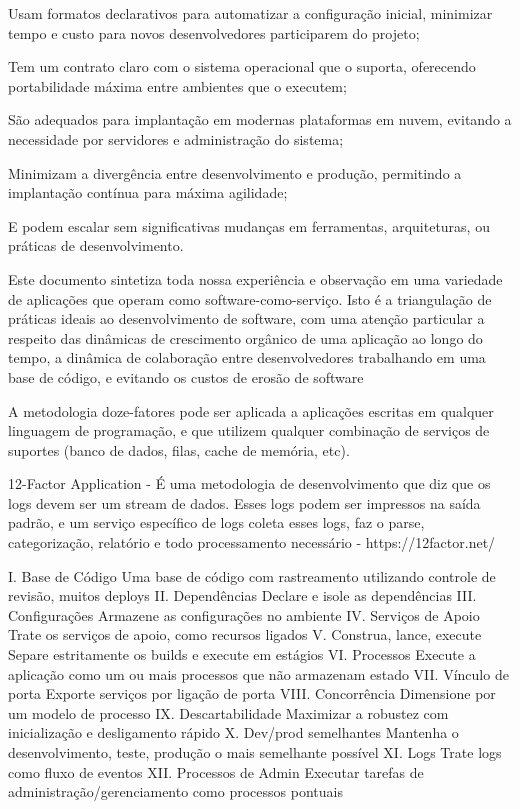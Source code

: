 Usam formatos declarativos para automatizar a configuração inicial, minimizar tempo e custo para novos desenvolvedores participarem do projeto;

Tem um contrato claro com o sistema operacional que o suporta, oferecendo portabilidade máxima entre ambientes que o executem;

São adequados para implantação em modernas plataformas em nuvem, evitando a necessidade por servidores e administração do sistema;

Minimizam a divergência entre desenvolvimento e produção, permitindo a implantação contínua para máxima agilidade;

E podem escalar sem significativas mudanças em ferramentas, arquiteturas, ou práticas de desenvolvimento.

Este documento sintetiza toda nossa experiência e observação em uma variedade de aplicações que operam como software-como-serviço. Isto é a triangulação de práticas ideais ao desenvolvimento de software, com uma atenção particular a respeito das dinâmicas de crescimento orgânico de uma aplicação ao longo do tempo, a dinâmica de colaboração entre desenvolvedores trabalhando em uma base de código, e evitando os custos de erosão de software

A metodologia doze-fatores pode ser aplicada a aplicações escritas em qualquer linguagem de programação, e que utilizem qualquer combinação de serviços de suportes (banco de dados, filas, cache de memória, etc).

12-Factor Application - É uma metodologia de desenvolvimento que diz que os logs devem ser um stream de dados. Esses logs podem ser impressos na saída padrão, e um serviço específico de logs coleta esses logs, faz o parse, categorização, relatório e todo processamento necessário - https://12factor.net/

I. Base de Código
Uma base de código com rastreamento utilizando controle de revisão, muitos deploys
II. Dependências
Declare e isole as dependências
III. Configurações
Armazene as configurações no ambiente
IV. Serviços de Apoio
Trate os serviços de apoio, como recursos ligados
V. Construa, lance, execute
Separe estritamente os builds e execute em estágios
VI. Processos
Execute a aplicação como um ou mais processos que não armazenam estado
VII. Vínculo de porta
Exporte serviços por ligação de porta
VIII. Concorrência
Dimensione por um modelo de processo
IX. Descartabilidade
Maximizar a robustez com inicialização e desligamento rápido
X. Dev/prod semelhantes
Mantenha o desenvolvimento, teste, produção o mais semelhante possível
XI. Logs
Trate logs como fluxo de eventos
XII. Processos de Admin
Executar tarefas de administração/gerenciamento como processos pontuais \cite{12factor}

